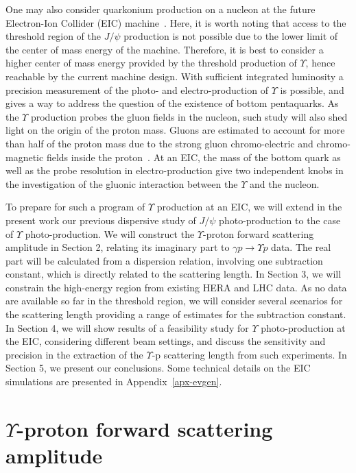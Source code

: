\documentclass[prd,amsmath,twocolumn,floatfix,amssymb, preprintnumbers, linenumbers,nofootinbib, superscriptaddress]{revtex4}
\begin{document}
One may also consider quarkonium production on a nucleon at the future Electron-Ion Collider (EIC) 
machine~\cite{Accardi:2012qut}. Here, it is worth noting that access to the threshold region of the $J/\psi$ production is not possible due to the lower limit of the center of mass energy of the machine. Therefore, it is best to consider a higher center of mass energy provided by the threshold production of $\Upsilon$, hence reachable by the current machine design. With sufficient integrated luminosity a precision measurement of the photo- and electro-production of $\Upsilon$ is possible, and gives a way to address the question of the existence of bottom pentaquarks. As the $\Upsilon$ production probes the gluon fields in the nucleon, such study will also shed light on the origin of the proton mass. Gluons are estimated to account for more than half of the proton mass due to the strong gluon chromo-electric and chromo-magnetic fields inside the proton~\cite{Ji:1994av}. 
At an EIC, the mass of the bottom quark as well as  the probe resolution in electro-production give two independent knobs in the investigation of the gluonic interaction between the $\Upsilon$ and the nucleon.  

To prepare for such a program of $\Upsilon$ production at an EIC, we will extend in the present work our previous dispersive study of $J/\psi$ photo-production to the case of $\Upsilon$ photo-production. We will construct the $\Upsilon$-proton forward scattering amplitude in Section 2, relating  
its imaginary part to $\gamma p \to \Upsilon p$ data. The real part will be calculated from a dispersion relation, involving one subtraction constant, which is directly related to the scattering length. 
In Section 3, we will constrain the high-energy region from existing HERA and LHC data. As no data are available so far in the threshold region, we will consider several scenarios for the scattering length providing a range of estimates for the subtraction constant. 
In Section 4, we will show results of a feasibility study for $\Upsilon$ photo-production at the EIC, considering different beam settings, and discuss the sensitivity and precision in the extraction of the 
$\Upsilon$-p scattering length from such experiments. 
In Section 5, we present our conclusions. Some technical details on the EIC simulations are presented in Appendix~\ref{apx-evgen}. 

\section{$\Upsilon$-proton forward scattering amplitude}
\end{document}
